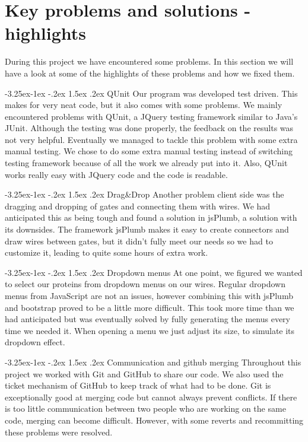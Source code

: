 \documentclass[a4paper]{article}
\makeatletter
\renewcommand\paragraph{\@startsection{paragraph}{4}{\z@}%
  {-3.25ex\@plus -1ex \@minus -.2ex}%
  {1.5ex \@plus .2ex}%
  {\normalfont\normalsize\bfseries}}
\makeatother
\begin{document}
\section{Key problems and solutions - highlights}

During this project we have encountered some problems. In this section we will have a look at some of the highlights of these problems and how we fixed them.

\paragraph{QUnit}
Our program was developed test driven. This makes for very neat code, but it also comes with some problems. We mainly encountered problems with QUnit, a JQuery testing framework similar to Java's JUnit. Although the testing was done properly, the feedback on the results was not very helpful. Eventually we managed to tackle this problem with some extra manual testing. We chose to do some extra manual testing instead of switching testing framework because of all the work we already put into it. Also, QUnit works really easy with JQuery code and the code is readable. 

\paragraph{Drag&Drop}
Another problem client side was the dragging and dropping of gates and connecting them with wires. We had anticipated this as being tough and found a solution in jsPlumb, a solution with its downsides. The framework jsPlumb makes it easy to create connectors and draw wires between gates, but it didn't fully meet our needs so we had to customize it, leading to quite some hours of extra work.

\paragraph{Dropdown menus}
At one point, we figured we wanted to select our proteins from dropdown menus on our wires. Regular dropdown menus from JavaScript are not an issues, however combining this with jsPlumb and bootstrap proved to be a little more difficult. This took more time than we had anticipated but was eventually solved by fully generating the menus every time we needed it. When opening a menu we just adjust its size, to simulate its dropdown effect.

\paragraph{Communication and github merging}
Throughout this project we worked with Git and GitHub to share our code. We also used the ticket mechanism of GitHub to keep track of what had to be done. Git is exceptionally good at merging code but cannot always prevent conflicts. If there is too little communication between two people who are working on the same code, merging can become difficult. However, with some reverts and recommitting these problems were resolved.
\end{document}
